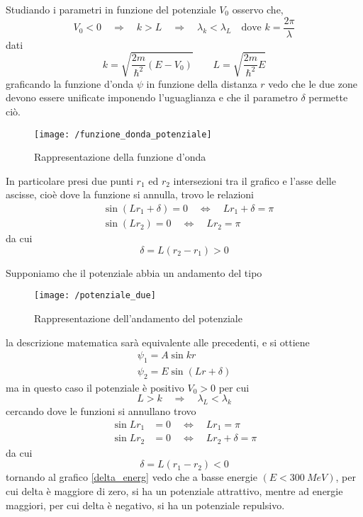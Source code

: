 Studiando i parametri in funzione del potenziale $V_0$ osservo che, 
\begin{equation}
V_0 < 0 
\quad\Rightarrow\quad 
k > L \quad\Rightarrow\quad 
\lambda_k < \lambda_L \quad \mbox{dove } k = \frac{2\pi}{\lambda}
\end{equation}
dati
\begin{equation}
k = \sqrt{\frac{2m}{\hbar^2}(E-V_0)} \quad\quad L = \sqrt{\frac{2m}{\hbar^2}E}
\end{equation}
graficando la funzione d'onda $\psi$ in funzione della distanza $r$ vedo che le due zone devono essere unificate imponendo l'uguaglianza e che il parametro $\delta$ permette ciò.
\begin{figure}[h]
\centering
\texttt{[image: /funzione\_donda\_potenziale]}
\caption{Rappresentazione della funzione d'onda}
\end{figure}
In particolare presi due punti $r_1$ ed $r_2$ intersezioni tra il grafico e l'asse delle ascisse, cioè dove la funzione si annulla, trovo le relazioni
\begin{equation}
\begin{split}
 & \sin (L r_1 + \delta) = 0 \quad\Leftrightarrow\quad L r_1 + \delta = \pi \\
 & \sin (L r_2) = 0 \quad\Leftrightarrow\quad L r_2 = \pi
\end{split}
\end{equation}
da cui
\begin{equation}
\delta = L (r_2 - r_1) > 0
\end{equation}

Supponiamo che il potenziale abbia un andamento del tipo 
\begin{figure}[h]
\centering
\texttt{[image: /potenziale\_due]}
\caption{Rappresentazione dell'andamento del potenziale}
\end{figure}
la descrizione matematica sarà equivalente alle precedenti, e si ottiene
\begin{equation}
\begin{split}
\psi_1 = A \sin k r \\
\psi_2 = E \sin (Lr + \delta)
\end{split}
\end{equation}
ma in questo caso il potenziale è positivo $V_0 > 0$ per cui
\begin{equation}
L > k \quad\Rightarrow\quad \lambda_L < \lambda_k
\end{equation}
cercando dove le funzioni si annullano trovo
\begin{equation}
\begin{split}
\sin L r_1 & = 0 \quad\Leftrightarrow\quad L r_1 = \pi \\
\sin L r_2 & = 0 \quad\Leftrightarrow\quad L r_2 + \delta = \pi 
\end{split}
\end{equation}
da cui
\begin{equation}
\delta = L (r_1 - r_2) < 0
\end{equation}
tornando al grafico \ref{delta_energ} vedo che a basse energie $(E< \SI{300}{MeV})$, per cui delta è maggiore di zero, si ha un potenziale attrattivo, mentre ad energie maggiori, per cui delta è negativo, si ha un potenziale repulsivo.

